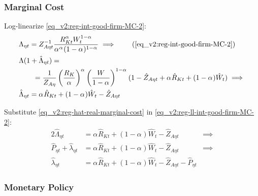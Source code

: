 \documentclass[../thesis.tex]{subfiles}
\begin{document}

\subsubsection*{Marginal Cost}

Log-linearize \ref{eq_v2:reg-int-good-firm-MC-2}:
\begin{alignat}{2}
	& \Lambda_{\eta t} = Z_{A\eta t}^{-1} \frac{R_{Kt}^{{\alpha_{}}} W_t^{1-{\alpha_{}}}}{{\alpha_{}}^{{\alpha_{}}} (1-{\alpha_{}})^{1-{\alpha_{}}}} \implies \tag{\ref{eq_v2:reg-int-good-firm-MC-2}} \\
	& \Lambda (1+ \hat{\Lambda}_{\eta t}) = \nonumber \\ & \qquad = \frac{1}{Z_{A\eta}} \left( \frac{R_{K}}{{\alpha_{}}} \right)^{{\alpha_{}}} \left( \frac{W}{1-{\alpha_{}}} \right)^{1-{\alpha_{}}} (1- \hat{Z}_{A\eta t} + {\alpha_{}} \hat{R}_{Kt} + (1- {\alpha_{}}) \hat{W}_{t} ) \implies \nonumber \\
	& \hat{\Lambda}_{\eta t} = {\alpha_{}} \hat{R}_{Kt} + (1- {\alpha_{}}) \hat{W}_{t} - \hat{Z}_{A\eta t} \label{eq_v2:reg-ll-int-good-firm-MC-2}
\end{alignat}

Substitute \ref{eq_v2:reg-hat-real-marginal-cost} in \ref{eq_v2:reg-ll-int-good-firm-MC-2}:
\begin{alignat}{2}
	\hat{\Lambda}_{\eta t} &= {\alpha_{}} \hat{R}_{Kt} + (1- {\alpha_{}}) \hat{W}_{t} - \hat{Z}_{A\eta t} &\implies \nonumber \\
	\hat{P}_{\eta t} + \hat{\lambda}_{\eta t} &= {\alpha_{}} \hat{R}_{Kt} + (1- {\alpha_{}}) \hat{W}_{t} - \hat{Z}_{A\eta t} &\implies \nonumber \\
	\hat{\lambda}_{\eta t} &= {\alpha_{}} \hat{R}_{Kt} + (1- {\alpha_{}}) \hat{W}_{t} - \hat{Z}_{A\eta t} - \hat{P}_{\eta t} \label{eq_v2:reg-ll-int-good-firm-MC-3}
\end{alignat}


\subsubsection*{Monetary Policy}
\end{document}

